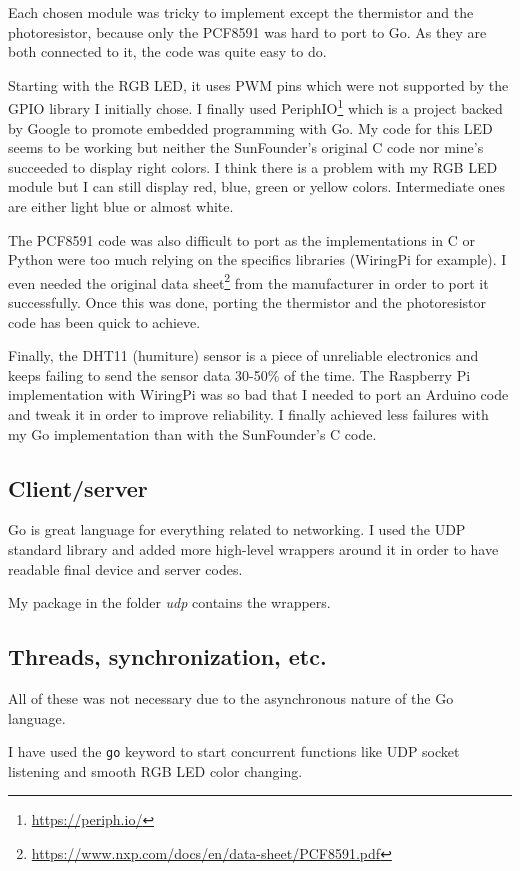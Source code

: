 \documentclass[11pt,a4paper]{article}
\newcommand{\rpi}{Raspberry Pi\xspace}
\begin{document}
Each chosen module was tricky to implement except the thermistor and the photoresistor, because only the PCF8591 was hard to port to Go. As they are both connected to it, the code was quite easy to do.

Starting with the RGB LED, it uses PWM pins which were not supported by the GPIO library I initially chose. I finally used PeriphIO\footnote{\url{https://periph.io/}} which is a project backed by Google to promote embedded programming with Go. My code for this LED seems to be working but neither the SunFounder's original C code nor mine's succeeded to display right colors. I think there is a problem with my RGB LED module but I can still display red, blue, green or yellow colors. Intermediate ones are either light blue or almost white.

The PCF8591 code was also difficult to port as the implementations in C or Python were too much relying on the specifics libraries (WiringPi for example). I even needed the original data sheet\footnote{\url{https://www.nxp.com/docs/en/data-sheet/PCF8591.pdf}} from the manufacturer in order to port it successfully. Once this was done, porting the thermistor and the photoresistor code has been quick to achieve.

Finally, the DHT11 (humiture) sensor is a piece of unreliable electronics and keeps failing to send the sensor data 30-50\% of the time. The \rpi implementation with WiringPi was so bad that I needed to port an Arduino code and tweak it in order to improve reliability. I finally achieved less failures with my Go implementation than with the SunFounder's C code.

\subsection{Client/server}
Go is great language for everything related to networking. I used the UDP standard library and added more high-level wrappers around it in order to have readable final device and server codes.

My package in the folder \emph{udp} contains the wrappers.

\subsection{Threads, synchronization, etc.}
All of these was not necessary due to the asynchronous nature of the Go language.

I have used the \texttt{go} keyword to start concurrent functions like UDP socket listening and smooth RGB LED color changing.
\end{document}
